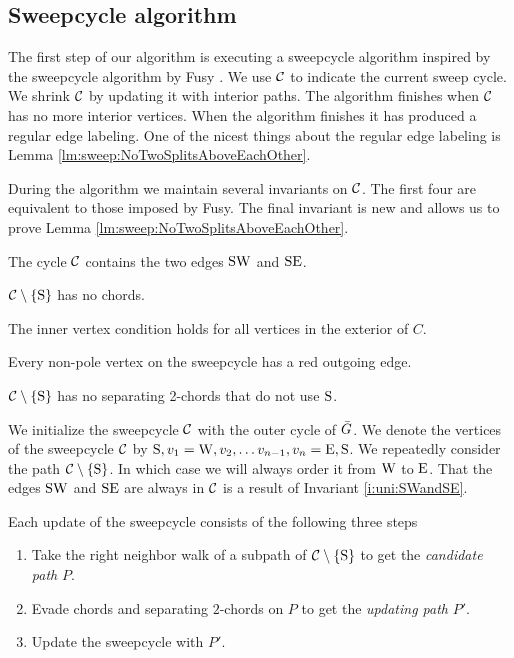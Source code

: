 
\subsection{Sweepcycle algorithm}
\thispagestyle{plain}
\label{ss:sweep}
The first step of our algorithm is executing a sweepcycle algorithm inspired by the sweepcycle algorithm by Fusy \cite{Fusy2006}. We use $\mathcal{C}$ to indicate the current sweep cycle. We shrink $\mathcal{C}$ by updating it with interior paths.
The algorithm finishes when $\mathcal{C}$ has no more interior vertices. When the algorithm finishes it has produced a regular edge labeling.
One of the nicest things about the regular edge labeling is Lemma \ref{lm:sweep:NoTwoSplitsAboveEachOther}.

During the algorithm we maintain several invariants on $\mathcal{C}$. The first four are equivalent to those imposed by Fusy. The final invariant is new and allows us to prove Lemma \ref{lm:sweep:NoTwoSplitsAboveEachOther}.

\begin{invariants}
  \itemsep=-4pt
  \item \label{i:uni:SWandSE} The cycle $\mathcal{C}$ contains the two edges $\mathrm{S} \mathrm{W}$ and $\mathrm{S} \mathrm{E}$.
  \item \label{i:uni:noChords} $\mathcal{C} \setminus \left\lbrace {\mathrm{S}} \right\rbrace$ has no chords.
  \item \label{i:uni:intVertCond} The inner vertex condition holds for all vertices in the exterior of $C$.
  \item \label{i:uni:redOutgoing} Every non-pole vertex on the sweepcycle has a red outgoing edge.
  \item \label{i:uni:no2Chords} $\mathcal{C}\setminus \left\lbrace {\mathrm{S}} \right\rbrace$ has no separating 2-chords that do not use $\mathrm{S}$.
\end{invariants}

We initialize the sweepcycle $\mathcal{C}$ with the outer cycle of $\bar{G}$.
We denote the vertices of the sweepcycle $\mathcal{C}$ by $\mathrm{S}, v_1 = \mathrm{W}, v_2, \ldots v_{n-1}, v_n = \mathrm{E}, \mathrm{S}$.
We repeatedly consider the path $\mathcal{C} \setminus \left\lbrace {\mathrm{S}} \right\rbrace$.
In which case we will always order it from $\mathrm{W}$ to $\mathrm{E}$. That the edges $\mathrm{S} \mathrm{W}$ and $\mathrm{S} \mathrm{E}$ are always in $\mathcal{C}$ is a result of Invariant \ref{i:uni:SWandSE}.


Each update of the sweepcycle consists of the following three steps
\begin{enumerate}
  \itemsep=-4pt
  \item Take the right neighbor walk of a subpath of $\mathcal{C} \setminus \left\lbrace {\mathrm{S}} \right\rbrace$ to get the \emph{candidate path} $P$.
  \item Evade chords and separating $2$-chords on $P$ to get the \emph{updating path} $P'$.
  \item Update the sweepcycle with $P'$.
\end{enumerate}

